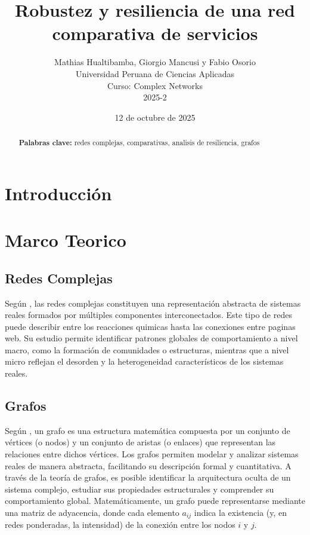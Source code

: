 \documentclass[twocolumn]{article}
\title{Robustez y resiliencia de una red comparativa de servicios}
\author{
    Mathias Hualtibamba, Giorgio Mancusi y Fabio Osorio \\
    Universidad Peruana de Ciencias Aplicadas \\
    Curso: Complex Networks \\
    2025-2 
}
\date{12 de octubre de 2025}
\newcommand{\keywords}[1]{\par\noindent\textbf{Palabras clave:} #1}
\begin{document}
\maketitle

\begin{abstract}
\blindtext[1]
\keywords{redes complejas, comparativas, analisis de resiliencia, grafos}
\end{abstract}

\section{Introducción}
\blindtext[2]

\section{Marco Teorico}
\subsection{Redes Complejas}
Según \cite{ding2025comprehensivesurveyartificialintelligence}, las redes complejas constituyen una representación abstracta de sistemas reales formados por múltiples componentes interconectados. 
Este tipo de redes puede describir entre los reacciones quimicas hasta las conexiones entre paginas web. Su estudio permite identificar patrones globales de comportamiento a nivel macro, como la formación de comunidades o estructuras, mientras que a nivel micro reflejan el desorden y la heterogeneidad característicos de los sistemas reales.

\subsection{Grafos}
Según \textcite{Zamora_L_pez_2024}, un grafo es una estructura matemática compuesta por un conjunto de vértices (o nodos) y un conjunto de aristas (o enlaces) que representan las relaciones entre dichos vértices. 
Los grafos permiten modelar y analizar sistemas reales de manera abstracta, facilitando su descripción formal y cuantitativa. 
A través de la teoría de grafos, es posible identificar la arquitectura oculta de un sistema complejo, estudiar sus propiedades estructurales y comprender su comportamiento global. 
Matemáticamente, un grafo puede representarse mediante una matriz de adyacencia, donde cada elemento $a_{ij}$ indica la existencia (y, en redes ponderadas, la intensidad) de la conexión entre los nodos $i$ y $j$.
\end{document}
